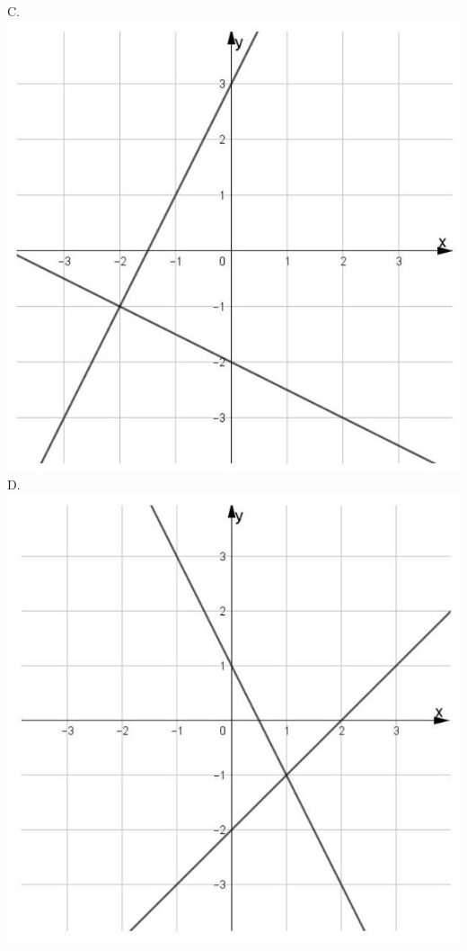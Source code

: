 \documentclass[10pt]{article}
\begin{document}
C.\\
\includegraphics[max width=\textwidth, center]{2024_11_21_fd555512e32c497e8a5dg-04(3)}\\
D.\\
\includegraphics[max width=\textwidth, center]{2024_11_21_fd555512e32c497e8a5dg-04(2)}
\end{document}
